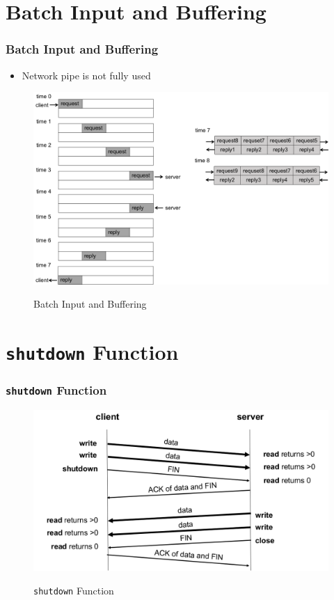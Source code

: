 \documentclass[notes,serif]{beamer}
\begin{document}
\section{Batch Input and Buffering}
\begin{frame}
\frametitle{Batch Input and Buffering}
\begin{itemize}
  \item Network pipe is not fully used
\end{itemize}
  \begin{figure}
  \centering
  \includegraphics[width=.8\textwidth]{fig/03fig09.png}\\
 \caption{Batch Input and Buffering}
  \label{11}
  \end{figure}
\end{frame}

\section{\texttt{shutdown} Function}
\begin{frame}
\frametitle{\texttt{shutdown} Function}
  \begin{figure}
  \centering
  \includegraphics[width=.8\textwidth]{fig/03fig10.png}\\
  \caption{\texttt{shutdown} Function}
  \label{12}
  \end{figure}
\end{frame}
\end{document}
